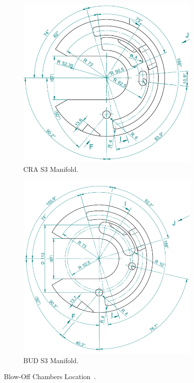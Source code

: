 \begin{figure}[H]
\centering
  \begin{subfigure}{0.4\textwidth}
  \centering
    \includegraphics[width=1\linewidth]{FIGURES/CRAloc.png}
    \caption{CRA S3 Manifold.}
  \end{subfigure}
  \begin{subfigure}{0.4\textwidth}
  \centering
    \includegraphics[width=1\linewidth]{FIGURES/BUDloc.png}
    \caption{BUD S3 Manifold.}
  \end{subfigure}
  \caption{Blow-Off Chambers Location~\cite{manifold2}.}
    \label{ManLoc}
\end{figure}

